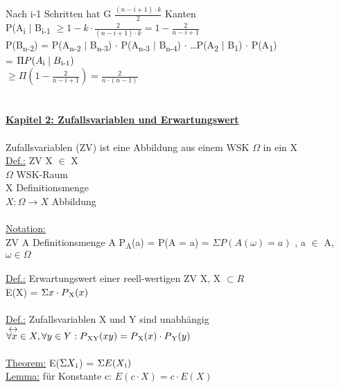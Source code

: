 \documentclass{article}
\begin{document}
 	Nach i-1 Schritten hat G $\frac{(n-i+1) \cdot k}{2}$ Kanten \\
 	P(A\textsubscript{i} $\mid$ B\textsubscript{i-1} $\geq 1 - k \cdot \frac{2}{(n-i+1) \cdot k} = 1 - \frac{2}{n-i+1}$ \\
 	P(B\textsubscript{n-2}) = P(A\textsubscript{n-2} $\mid$ B\textsubscript{n-3}) $\cdot$ P(A\textsubscript{n-3} $\mid$ B\textsubscript{n-4}) $\cdot$ \ldots P(A\textsubscript{2} $\mid$ B\textsubscript{1}) $\cdot$ P(A\textsubscript{1}) \\
 	= $\Pi P(A\textsubscript{i} \mid B\textsubscript{i-1})$ \\
 	$\geq \Pi (1 - \frac{2}{n-i+1}) = \frac{2}{n \cdot (n-1)}$ \\
 	\\
 	\\
 	\textbf{\underline{Kapitel 2: Zufallsvariablen und Erwartungswert}}\\
 	\\
 	Zufallsvariablen (ZV) ist eine Abbildung aus einem WSK $\Omega$ in ein X \\
 	\underline{Def.:} ZV X $\in$ X\\
 	$\Omega$ WSK-Raum \\
 	X Definitionsmenge \\
 	$X: \Omega \rightarrow X$ Abbildung \\
 	\\
 	\underline{Notation:} \\
 	ZV A
 	Definitionsmenge A
 	P\textsubscript{A}(a) = P(A = a) = $\Sigma P(A(\omega) = a)$ , a $\in$ A, $\omega \in \Omega$ \\
 	\\
 	\underline{Def.:} Erwartungswert einer reell-wertigen ZV X, X $\subset R$ \\
 	E(X) = $\Sigma x \cdot P\textsubscript{X}(x)$ \\
 	\\
 	\underline{Def.:} Zufallsvariablen X und Y sind unabhängig \\
 	$\leftrightarrow$ \\
 	$\forall x \in X, \forall y \in Y: P\textsubscript{XY}(xy) = P\textsubscript{X}(x) \cdot P\textsubscript {Y}(y)$ \\
 	\\
 	\underline{Theorem:} E($\Sigma X\textsubscript{i}$) = $\Sigma E(X\textsubscript{i})$ \\
 	\underline{Lemma:} für Konstante c: $E(c \cdot X) = c \cdot E(X)$ \\
 	\\
\end{document}
